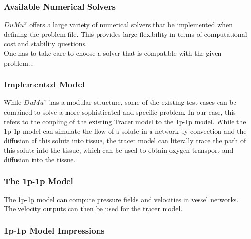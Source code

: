 \subsubsection*{Available Numerical Solvers}

$DuMu^x$ offers a large variety of numerical solvers that be implemented when defining the problem-file. This provides large flexibility in terms of computational cost and stability questions. \cite{flemischdumux}
\\One has to take care to choose a solver that is compatible with the given problem...

\subsubsection{Implemented Model}

While $DuMu^x$ has a modular structure, some of the existing test cases can be combined to solve a more sophisticated and specific problem. In our case, this refers to the coupling of the existing Tracer model to the 1p-1p model. While the 1p-1p model can simulate the flow of a solute in a network by convection and the diffusion of this solute into tissue, the tracer model can literally trace the path of this solute into the tissue, which can be used to obtain oxygen transport and diffusion into the tissue.

\subsubsection*{The 1p-1p Model}

The 1p-1p model can compute pressure fields and velocities in vessel networks. The velocity outputs can then be used for the tracer model.

\subsubsection*{\footnotesize 1p-1p Model Impressions}

